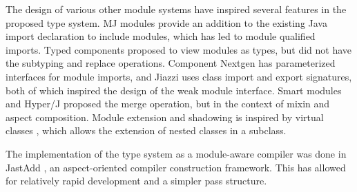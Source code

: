 The design of various other module systems have inspired several features in the 
proposed type system. MJ modules \cite{corwinMJModules} provide an addition to
the existing Java import declaration to include modules, which has led to module
qualified imports. Typed components \cite{secotypedcomponents} proposed to
view modules as types, but did not have the subtyping and replace operations.
Component Nextgen \cite{componentnextgen} has parameterized interfaces for module imports,
and Jiazzi \cite{mcdirmid01jiazzi} uses class import and export signatures, 
both of which inspired the design of the weak module interface. Smart modules
\cite{Ancona05smartmodules} and Hyper/J \cite{hyperj} proposed the merge operation, 
but in the context of mixin and aspect composition. Module extension and shadowing is inspired by 
virtual classes \cite{virtualclasses89}, which allows the extension of nested classes in a subclass.

The implementation of the type system as a module-aware compiler was done in JastAdd \cite{jastadd},
an aspect-oriented compiler construction framework. This has allowed for relatively
rapid development and a simpler pass structure.